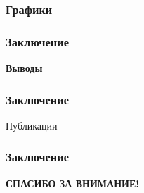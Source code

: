\documentclass[compress,professionalfont]{beamer}
\begin{document}
\begin{frame}
\frametitle{Графики}

\end{frame}

\begin{frame}
\frametitle{Заключение}

\begin{center}
\Huge\bf Выводы
\end{center}

\end{frame}

\begin{frame}
\frametitle{Заключение}

Публикации
\begin{center}

\end{center}

\end{frame}

\begin{frame}

\frametitle{Заключение}

\begin{center}
\Large\bf СПАСИБО ЗА ВНИМАНИЕ!
\end{center}

\end{frame}
\end{document}
